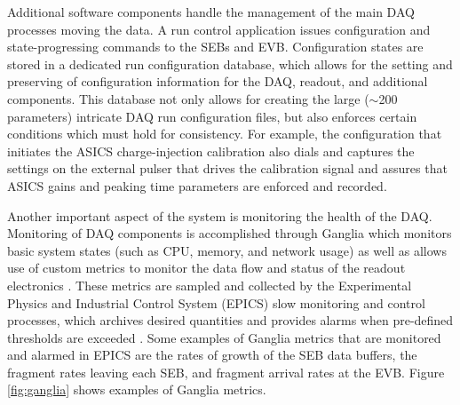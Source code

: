Additional software components handle the management of the main DAQ processes moving the data. A run control application issues configuration and state-progressing commands to the SEBs and EVB. Configuration states are stored in a dedicated run configuration database, which allows for the setting and preserving of configuration information for the DAQ, readout, and additional components. This database not only allows for creating the large ($\sim$200 parameters) intricate DAQ run configuration files, but also enforces certain conditions which must hold for consistency. For example, the configuration that initiates the ASICS charge-injection calibration also dials and captures the settings on the external pulser that drives the calibration signal and assures that ASICS gains and peaking time parameters are enforced and recorded. %

Another important aspect of the system is monitoring the health of the DAQ. Monitoring of DAQ components is accomplished through Ganglia which monitors basic system states (such as CPU, memory, and network usage) as well as allows use of custom metrics to monitor the data flow and status of the readout electronics \cite{GangliaBook}. These metrics are sampled and collected by the Experimental Physics and Industrial Control System (EPICS) slow monitoring and control processes, which archives desired quantities and provides alarms when pre-defined thresholds are exceeded \cite{EPICS}. Some examples of Ganglia metrics that are monitored and alarmed in EPICS are the rates of growth of the SEB data buffers, the fragment rates leaving each SEB, and fragment arrival rates at the EVB.  Figure \ref{fig:ganglia} shows examples of Ganglia metrics.  

